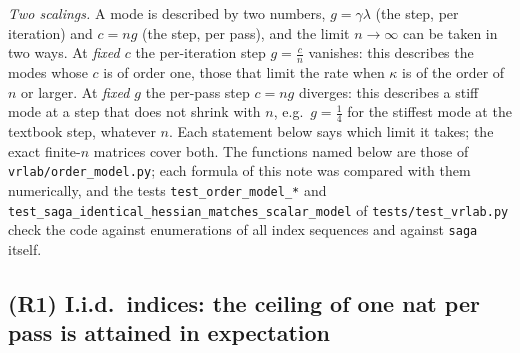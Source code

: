 \emph{Two scalings.} A mode is described by two numbers, $g=\gamma\lambda$ (the step, per iteration) and $c=ng$ (the step, per pass), and the limit $n\to\infty$ can be taken in two ways. At \emph{fixed $c$} the per-iteration step $g=\frac cn$ vanishes: this describes the modes whose $c$ is of order one, those that limit the rate when $\kappa$ is of the order of $n$ or larger. At \emph{fixed $g$} the per-pass step $c=ng$ diverges: this describes a stiff mode at a step that does not shrink with $n$, e.g.\ $g=\frac14$ for the stiffest mode at the textbook step, whatever $n$. Each statement below says which limit it takes; the exact finite-$n$ matrices cover both. The functions named below are those of \texttt{vrlab/order\_model.py}; each formula of this note was compared with them numerically, and the tests \texttt{test\_order\_model\_*} and \texttt{test\_saga\_identical\_hessian\_matches\_scalar\_model} of \texttt{tests/test\_vrlab.py} check the code against enumerations of all index sequences and against \texttt{saga} itself.

\subsection{(R1) I.i.d.\ indices: the ceiling of one nat per pass is attained in expectation}\label{sec:B4-iid}

